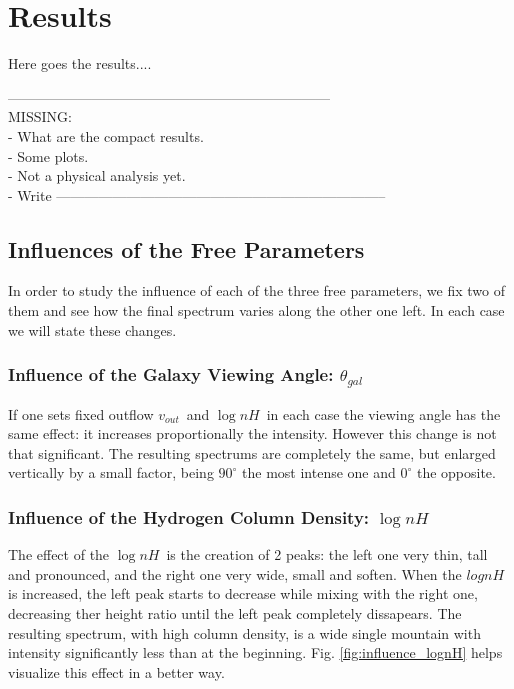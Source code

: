 \documentclass{emulateapj}
\newcommand{\ang}{{$\theta_{gal}$~}}
\newcommand{\lognh}{{$\log{nH}$~}}
\newcommand{\vel}{{$v_{out}$~}}
\begin{document}
\section{Results}
\label{sec:results}
Here goes the results....

---------------------------------------------------------------------\\
MISSING: \\
- What are the compact results.\\
- Some plots.\\
- Not a physical analysis yet. \\
- Write 
-----------------------------------------------------------------------\\

\subsection{Influences of the Free Parameters}

In order to study the influence of each of the three free parameters, we fix two of them and see how the final spectrum varies along the other one left. In each case we will state these changes.

\subsubsection{Influence of the Galaxy Viewing Angle: \ang}

If one sets fixed outflow \vel and \lognh in each case the viewing angle has the same effect: it increases proportionally the intensity. However this change is not that significant. The resulting spectrums are completely the same, but enlarged vertically by a small factor, being $90^\circ$ the most intense one and $0^\circ$ the opposite.\\

\subsubsection{Influence of the Hydrogen Column Density: \lognh }

The effect of the \lognh is the creation of 2 peaks: the left one very thin, tall and pronounced, and the right one very wide, small and soften. When the $log{nH}$ is increased, the left peak starts to decrease while mixing with the right one, decreasing ther height ratio until the left peak completely dissapears. The resulting spectrum, with high column density, is a wide single mountain with intensity significantly less than at the beginning. Fig. \ref{fig:influence_lognH} helps visualize this effect in a better way.\\
\end{document}
